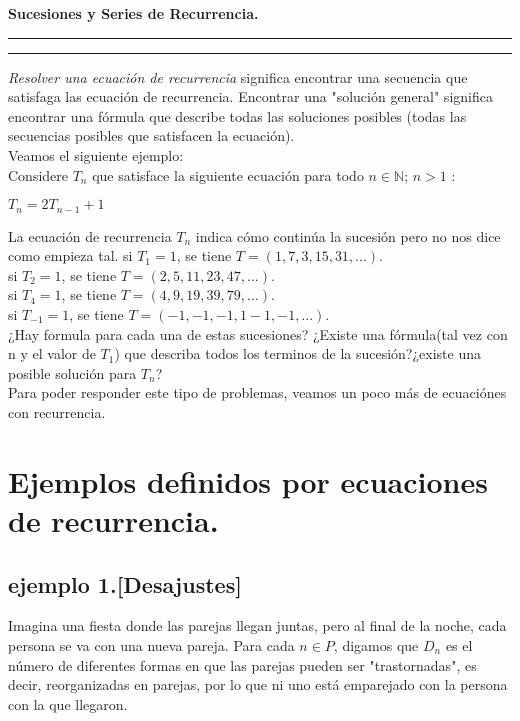 \documentclass[11pt,a4paper]{article}
\begin{document}
\pagestyle{empty}
\begin{minipage}[c]{10cm}
\end{minipage}
\begin{center}
\textbf{Sucesiones y Series de Recurrencia.}
\end{center}
\vspace*{-0.1cm}
\hrule
\vspace*{0.1cm}
\rule{17cm}{1mm}
\vspace{0.2cm}

\textit{Resolver una ecuación de recurrencia} significa encontrar una secuencia que satisfaga las ecuación de recurrencia. Encontrar una "solución general" significa encontrar una fórmula que describe todas las soluciones posibles (todas las secuencias posibles que satisfacen la ecuación).\\
Veamos el siguiente ejemplo:\\
Considere $T_{n}$ que satisface la siguiente ecuación para todo $n \in \mathbb{N}$; $n>1$ : 
\begin{center}
$T_{n} = 2T_{n-1} + 1 $ 
\end{center}

La ecuación de recurrencia $T_{n}$ indica cómo continúa la sucesión pero no nos dice como empieza tal.
\newline
si $T_{1} = 1$,\hspace*{1cm} se tiene $T = (1,7,3,15,31,...)$.\\
si $T_{2} = 1$,\hspace*{1cm} se tiene $T = (2,5,11,23,47,...)$.\\
si $T_{4} = 1$,\hspace*{1cm} se tiene $T = (4,9,19,39,79,...)$.\\
si $T_{-1}= 1$,\hspace*{1cm} se tiene $T = (-1,-1,-1,1-1,-1,...)$.\\

 ¿Hay formula para cada una de estas sucesiones? ¿Existe una fórmula(tal vez con n y el valor de $T_{1}$) que describa todos los terminos de la sucesión?¿existe una posible solución para $T_{n}$?\\Para poder responder este tipo de problemas, veamos un poco más de ecuaciónes con recurrencia.

\section{Ejemplos definidos por ecuaciones de recurrencia.}
\subsection{ejemplo 1.[Desajustes]}
Imagina una fiesta donde las parejas llegan juntas, pero al final de la noche, cada persona se va con una nueva pareja. Para cada $n \in P$, digamos que $D_{n}$ es el número de diferentes formas en que las parejas pueden ser "trastornadas", es decir, reorganizadas en parejas, por lo que ni uno está emparejado con la persona con la que llegaron.\\
\end{document}
